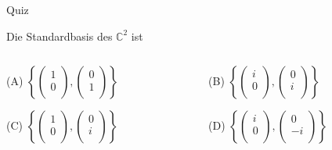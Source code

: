 \documentclass[german]{beamer}
\begin{document}
\begin{frame}{Quiz}

Die Standardbasis des $\mathbb{C}^2$ ist

\vspace*{5mm}

\begin{columns}[b]
\begin{column}{6cm}
\begin{description}
\item{(A)} $\left\{ \left( \begin{array}{c} 1 \\ 0 \\ \end{array} \right), \left( \begin{array}{c} 0 \\ 1 \\ \end{array} \right) \right\}$
\item{(C)} $\left\{ \left( \begin{array}{c} 1 \\ 0 \\ \end{array} \right), \left( \begin{array}{c} 0 \\ i \\ \end{array} \right) \right\}$
\end{description}
\end{column}
\begin{column}{7cm}
\begin{description}
\item{(B)} $\left\{ \left( \begin{array}{c} i \\ 0 \\ \end{array} \right), \left( \begin{array}{c} 0 \\ i \\ \end{array} \right) \right\}$
\item{(D)} $\left\{ \left( \begin{array}{c} i \\ 0 \\ \end{array} \right), \left( \begin{array}{c} 0 \\ -i \\ \end{array} \right) \right\}$
\end{description}
\end{column}
\end{columns}

\end{frame}
\end{document}
